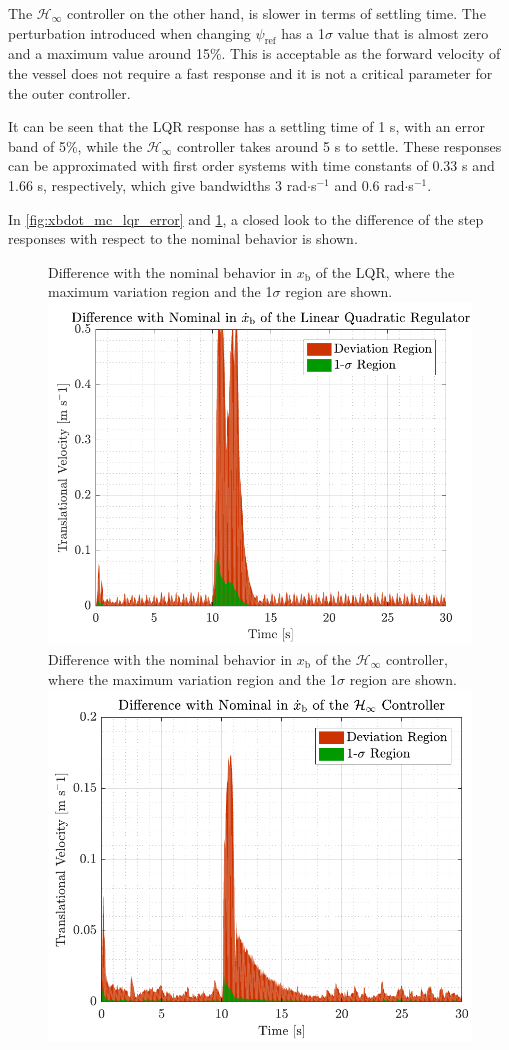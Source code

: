 The $\mathcal{H}_\infty$ controller on the other hand, is slower in terms of settling time. The perturbation introduced when changing $\psi_\mathrm{ref}$ has a 1$\sigma$ value that is almost zero and a maximum value around 15\%. This is acceptable as the forward velocity of the vessel does not require a fast response and it is not a critical parameter for the outer controller.

It can be seen that the LQR response has a settling time of 1 s, with an error band of 5\%, while the $\mathcal{H}_\infty$ controller takes around 5 s to settle. These responses can be approximated with first order systems with time constants of \num{0.33} s and \num{1.66} s, respectively, which give bandwidths \num{3} rad$\cdot$s$^{-1}$ and \num{0.6} rad$\cdot$s$^{-1}$.

In \autoref{fig:xbdot_mc_lqr_error} and \ref{fig:xbdot_mc_rob_error}, a closed look to the difference of the step responses with respect to the nominal behavior is shown.
\begin{figure}[H]
    \captionbox 
    {   
        Difference with the nominal behavior in $x_\mathrm{b}$ of the LQR, where the maximum variation region and the 1$\sigma$ region are shown.
        \label{fig:xbdot_mc_lqr_error}
    }                                                                 
    {                                                                  
        \includegraphics[width=.45\textwidth]{figures/xbdot_mc_lqr_error}         
    }                                                                    
    \hspace{5pt}                                                          
    \captionbox  
    {      
         Difference with the nominal behavior in $x_\mathrm{b}$ of the $\mathcal{H}_\infty$ controller, where the maximum variation region and the 1$\sigma$ region are shown.
        \label{fig:xbdot_mc_rob_error}
    }                                                                          
    {
        \includegraphics[width=.45\textwidth]{figures/xbdot_mc_rob_error}
    }
\end{figure}

